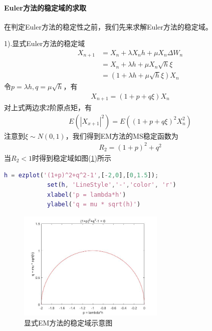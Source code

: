             \paragraph{Euler方法的稳定域的求取}
            在判定Euler方法的稳定性之前，我们先来求解Euler方法的稳定域。
            \par
            1).显式Euler方法的稳定域
            \begin{align*}
                X_{n+1} &= X_n + \lambda X_n h + \mu X_n \Delta W_n\\
                &=X_n + \lambda h + \mu X_n\sqrt{h}\xi\\
                &=(1+\lambda h +\mu \sqrt{h}\xi)X_n
            \end{align*}
            令$p = \lambda h,q = \mu \sqrt{h}$，有
            \begin{align*}
            X_{n+1} = (1 + p+ q\xi)X_n
            \end{align*}
            对上式两边求2阶原点矩，有
            \begin{align*}
                E(|X_{x+1}|^2) = E \left( (1+p+q\xi)^2X_n ^2\right)
            \end{align*}
            注意到$\xi \sim N(0,1)$，我们得到EM方法的MS稳定函数为
            \begin{align*}
                R_2 = (1+p)^2 +q^2
            \end{align*}
            当$R_2<1$时得到稳定域如图(\ref{fig:显式EM方法的稳定域示意图})所示
            \begin{lstlisting}[language = Matlab]
            h = ezplot('(1+p)^2+q^2-1',[-2,0],[0,1.5]);
            set(h, 'LineStyle','-','color', 'r')
            xlabel('p = lambda*h')
            ylabel('q = mu * sqrt(h)')
            \end{lstlisting}
           \begin{figure}[H]
           \centering
           \includegraphics[width=7cm]{images/EM_stable_domain.jpg}
           \caption{显式EM方法的稳定域示意图}
           \label{fig:显式EM方法的稳定域示意图}
           \end{figure}
